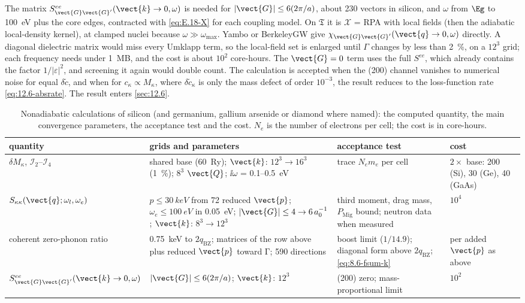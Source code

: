 The matrix $S^{ee}_{\vect{G}\vect{G}'}(\vect{k}\to0,\omega)$ is needed for $|\vect{G}| \le 6(2\pi/a)$, about 230 vectors in silicon, and $\omega$ from $\Eg$ to \SI{100}{eV} plus the core edges, contracted with \cref{eq:E.18-X} for each coupling model. On $\mathfrak{T}$ it is $\mathcal{X}$ = RPA with local fields (then the adiabatic local-density kernel), at clamped nuclei because $\omega \gg \omega_{\mathrm{max}}$. Yambo or BerkeleyGW give $\chi_{\vect{G}\vect{G}'}(\vect{q}\to0,\omega)$ directly. A diagonal dielectric matrix would miss every Umklapp term, so the local-field set is enlarged until $\varGamma$ changes by less than \SI{2}{\percent}, on a $12^3$ grid; each frequency needs under \SI{1}{MB}, and the cost is about $10^2$ core-hours. The $\vect{G} = 0$ term uses the full $S^{ee}$, which already contains the factor $1/|\varepsilon|^2$, and screening it again would double count. The calculation is accepted when the (200) channel vanishes to numerical noise for equal $\delta\tilde c$, and when for $c_\kappa \propto M_\kappa$, where $\delta\tilde c_\kappa$ is only the mass defect of order $10^{-3}$, the result reduces to the loss-function rate \cref{eq:12.6-absrate}. The result enters \cref{sec:12.6}.

\begin{table}[t]
  \centering
  \caption{Nonadiabatic calculations of silicon (and germanium, gallium arsenide or diamond where named): the computed quantity, the main convergence parameters, the acceptance test and the cost. $N_e$ is the number of electrons per cell; the cost is in core-hours.}
  \label{tab:E18-params}
  \small
  \setlength{\tabcolsep}{4pt}
  \begin{tabular}{p{}p{}p{}p{}}
    \toprule
    quantity & grids and parameters & acceptance test & cost \\
    \midrule
    $\delta M_\kappa$, $\mathcal{I}_2$--$\mathcal{I}_4$ & shared base (\SI{60}{Ry}); $\vect{k}$: $12^3\to16^3$ (\SI{1}{\percent}); $8^3$ $\vect{Q}$; $\ii\omega$ = 0.1--\SI{0.5}{eV} & trace $N_e m_e$ per cell & $2\times$ base: 200 (Si), 30 (Ge), 40 (GaAs) \\
    $S_{\kappa\kappa}(\vect{q};\omega_l,\omega_e)$ & $p \le \SI{30}{keV}$ from 72 reduced $\vect{p}$; $\omega_e \le \SI{100}{eV}$ in \SI{0.05}{eV}; $|\vect{G}| \le 4\to6\,a_0^{-1}$; $\vect{k}$: $8^3\to12^3$ & third moment, drag mass, $P_{\mathrm{Mig}}$ bound; neutron data when measured & $10^4$ \\
    coherent zero-phonon ratio & \SI{0.75}{keV} to $2q_{\mathrm{BZ}}$; matrices of the row above plus reduced $\vect{p}$ toward $\mathrm{\Gamma}$; 590 directions & boost limit ($1/14.9$); diagonal form above $2q_{\mathrm{BZ}}$; \cref{eq:8.6-fsum-k} & per added $\vect{p}$ as above \\
    $S^{ee}_{\vect{G}\vect{G}'}(\vect{k}\to0,\omega)$ & $|\vect{G}| \le 6(2\pi/a)$; $\vect{k}$: $12^3$ & (200) zero; mass-proportional limit & $10^2$ \\
    \bottomrule
  \end{tabular}
\end{table}
